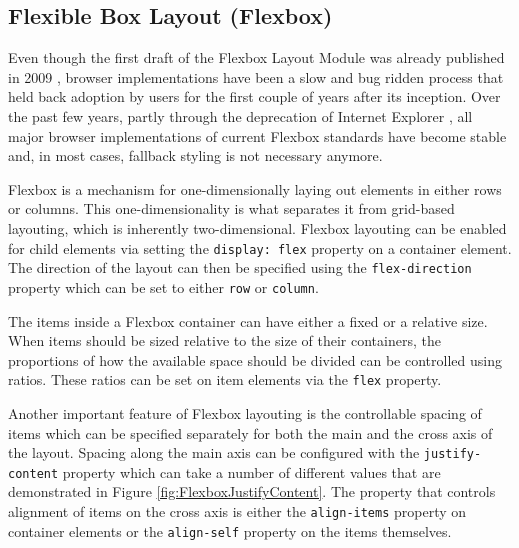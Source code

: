 \subsection{Flexible Box Layout (Flexbox)}

Even though the first draft of the Flexbox Layout Module was already published in 2009 \parencite{CSSFlexboxFirstDraft}, browser implementations have been a slow and bug ridden process \parencite{CanIUseCSSFlexbox} that held back adoption by users for the first couple of years after its inception. Over the past few years, partly through the deprecation of Internet Explorer \parencite{IEDeprecation}, all major browser implementations of current Flexbox standards \parencite{CSSFlexbox} have become stable and, in most cases, fallback styling is not necessary anymore.

Flexbox is a mechanism for one-dimensionally laying out elements in either rows or columns. This one-dimensionality is what separates it from grid-based layouting, which is inherently two-dimensional. Flexbox layouting can be enabled for child elements via setting the \lstinline{display: flex} property on a container element. The direction of the layout can then be specified using the \lstinline{flex-direction} property which can be set to either \lstinline{row} or \lstinline{column}.

The items inside a Flexbox container can have either a fixed or a relative size. When items should be sized relative to the size of their containers, the proportions of how the available space should be divided can be controlled using ratios. These ratios can be set on item elements via the \lstinline{flex} property.

Another important feature of Flexbox layouting is the controllable spacing of items which can be specified separately for both the main and the cross axis of the layout. Spacing along the main axis can be configured with the \lstinline{justify-content} property which can take a number of different values that are demonstrated in Figure \ref{fig:FlexboxJustifyContent}. The property that controls alignment of items on the cross axis is either the \lstinline{align-items} property on container elements or the \lstinline{align-self} property on the items themselves.

